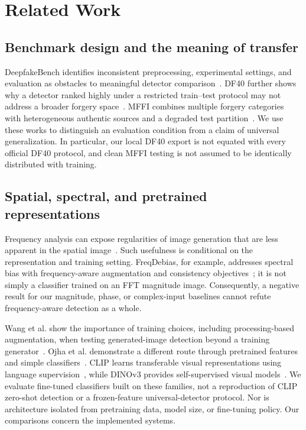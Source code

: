 \documentclass[conference,10pt,letterpaper]{IEEEtran}
\begin{document}
\section{Related Work}
\subsection{Benchmark design and the meaning of transfer}
DeepfakeBench identifies inconsistent preprocessing, experimental settings, and evaluation as obstacles to meaningful detector comparison~\cite{yan2023bench}. DF40 further shows why a detector ranked highly under a restricted train--test protocol may not address a broader forgery space~\cite{yan2024df40}. MFFI combines multiple forgery categories with heterogeneous authentic sources and a degraded test partition~\cite{miao2025}. We use these works to distinguish an evaluation condition from a claim of universal generalization. In particular, our local DF40 export is not equated with every official DF40 protocol, and clean MFFI testing is not assumed to be identically distributed with training.



\subsection{Spatial, spectral, and pretrained representations}
Frequency analysis can expose regularities of image generation that are less apparent in the spatial image~\cite{frank2020}. Such usefulness is conditional on the representation and training setting. FreqDebias, for example, addresses spectral bias with frequency-aware augmentation and consistency objectives~\cite{kashiani2025}; it is not simply a classifier trained on an FFT magnitude image. Consequently, a negative result for our magnitude, phase, or complex-input baselines cannot refute frequency-aware detection as a whole.

Wang et al. show the importance of training choices, including processing-based augmentation, when testing generated-image detection beyond a training generator~\cite{wang2020}. Ojha et al. demonstrate a different route through pretrained features and simple classifiers~\cite{ojha2023}. CLIP learns transferable visual representations using language supervision~\cite{radford2021}, while DINOv3 provides self-supervised visual models~\cite{simeoni2025}. We evaluate fine-tuned classifiers built on these families, not a reproduction of CLIP zero-shot detection or a frozen-feature universal-detector protocol. Nor is architecture isolated from pretraining data, model size, or fine-tuning policy. Our comparisons concern the implemented systems.
\end{document}
